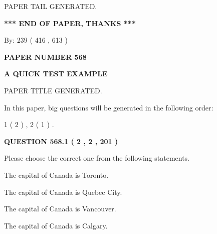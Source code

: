 \documentclass[12pt]{article}
\begin{document}
   
   
   
   
   
 \vspace{0.2in}
 
   
   
\vspace{2.0in} PAPER TAIL GENERATED.
   
   
   
   
\vspace{1.0in} 
{\textbf{\large{ *** END OF PAPER, THANKS *** }}} 
   
   
\hspace{1.0in} By: 
 239 ( 416 ,  613 )
   
   
   
   
\newpage 
\setcounter{page}{ 
   568001 } 
   
   
   
   
 {\textbf{ \Large{ PAPER NUMBER  568  }}}
   
   
\vspace{0.2in}
   
   
   
   
   
   
   
   
 \vspace{0.2in}
{\LARGE {\textbf{ A QUICK TEST EXAMPLE}}}
   
   
 PAPER TITLE GENERATED.
   
   
   
\vspace{0.2in}
   
In this paper, big questions will be generated in the following order: 
   
   
   1 ( 2 )
 ,
   2 ( 1 )
 .
  
\vspace{0.2in}
  
{\textbf{\Large{QUESTION
568.1 
 ( 2 , 2 , 201 )
}}}
  
  
Please choose the correct one from the following statements.
 
 
The capital of Canada is Toronto.
 
 
The capital of Canada is Quebec City.
 
 
The capital of Canada is Vancouver.
 
 
The capital of Canada is Calgary.
 
\end{document}
